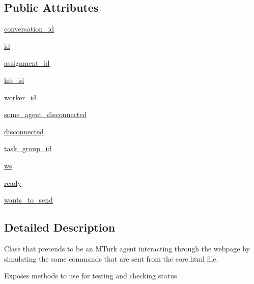 \subsection*{Public Attributes}
\begin{DoxyCompactItemize}
\item 
\hyperlink{classparlai_1_1mturk_1_1core_1_1dev_1_1test_1_1test__socket__manager_1_1MockAgent_a21ba5d90cf3547f6189e7d2177af8121}{conversation\+\_\+id}
\item 
\hyperlink{classparlai_1_1mturk_1_1core_1_1dev_1_1test_1_1test__socket__manager_1_1MockAgent_a0b8b022e8140e9251659ccabe9fcb33d}{id}
\item 
\hyperlink{classparlai_1_1mturk_1_1core_1_1dev_1_1test_1_1test__socket__manager_1_1MockAgent_af44235241bced0c401cd8fef3252a0a4}{assignment\+\_\+id}
\item 
\hyperlink{classparlai_1_1mturk_1_1core_1_1dev_1_1test_1_1test__socket__manager_1_1MockAgent_a0aedeb9d62656383763abbf154857c37}{hit\+\_\+id}
\item 
\hyperlink{classparlai_1_1mturk_1_1core_1_1dev_1_1test_1_1test__socket__manager_1_1MockAgent_adabb3feeb1730f04d80f84c855d86200}{worker\+\_\+id}
\item 
\hyperlink{classparlai_1_1mturk_1_1core_1_1dev_1_1test_1_1test__socket__manager_1_1MockAgent_a86f4ed77012aca5d7600238f1b370047}{some\+\_\+agent\+\_\+disconnected}
\item 
\hyperlink{classparlai_1_1mturk_1_1core_1_1dev_1_1test_1_1test__socket__manager_1_1MockAgent_a52c8b93cf5a7e16b75da176dd0caba8a}{disconnected}
\item 
\hyperlink{classparlai_1_1mturk_1_1core_1_1dev_1_1test_1_1test__socket__manager_1_1MockAgent_abbdca65743dccef13d2168f4904f1bf8}{task\+\_\+group\+\_\+id}
\item 
\hyperlink{classparlai_1_1mturk_1_1core_1_1dev_1_1test_1_1test__socket__manager_1_1MockAgent_a4b3ec6c638cfe8095425ddab95a69cac}{ws}
\item 
\hyperlink{classparlai_1_1mturk_1_1core_1_1dev_1_1test_1_1test__socket__manager_1_1MockAgent_af77ac0423935da0060e9d632c82e03aa}{ready}
\item 
\hyperlink{classparlai_1_1mturk_1_1core_1_1dev_1_1test_1_1test__socket__manager_1_1MockAgent_a9b5d912718218efb899c9de68e82b4d2}{wants\+\_\+to\+\_\+send}
\end{DoxyCompactItemize}


\subsection{Detailed Description}
\begin{DoxyVerb}Class that pretends to be an MTurk agent interacting through the webpage by
simulating the same commands that are sent from the core.html file.

Exposes methods to use for testing and checking status
\end{DoxyVerb}
 

